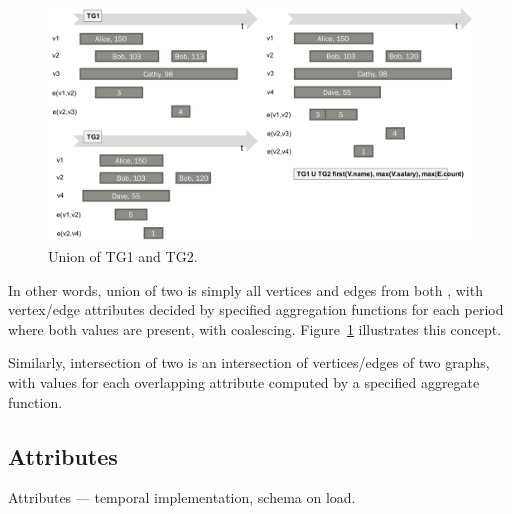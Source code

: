 \begin{figure}
\includegraphics[width=6.5in]{figs/union.pdf}
\caption{Union of TG1 and TG2.}
\label{fig:union}
\end{figure}

In other words, union of two \tgs is simply all vertices and edges
from both \tgs, with vertex/edge attributes decided by specified
aggregation functions for each period where both values are present,
with coalescing.  Figure~\ref{fig:union} illustrates this concept.

Similarly, intersection of two \tgs is an intersection of
vertices/edges of two graphs, with values for each overlapping
attribute computed by a specified aggregate function.

\subsection{Attributes}

Attributes --- temporal implementation, schema on load.

